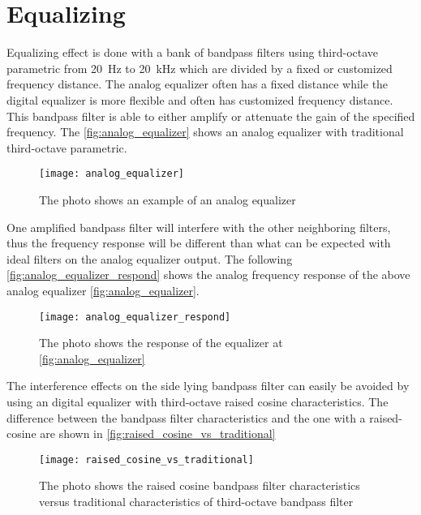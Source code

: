 \section{Equalizing}
Equalizing effect is done with a bank of bandpass filters using third-octave parametric from \SI{20}{\hertz} to \SI{20}{\kilo\hertz} which are divided by a fixed or customized frequency distance. The analog equalizer often has a fixed distance while the digital equalizer is more flexible and often has customized frequency distance. This bandpass filter is able to either amplify or attenuate the gain of the specified frequency. The \autoref{fig:analog_equalizer} shows an analog equalizer with traditional third-octave parametric. \cite{nordic}

\begin{figure} [htbp]
 \centering
  \texttt{[image: analog\_equalizer]}
  \caption{The photo shows an example of an analog equalizer}
  \label{fig:analog_equalizer}
\end{figure}

One amplified bandpass filter will interfere with the other neighboring filters, thus the frequency response will be different than what can be expected with ideal filters on the analog equalizer output. The following \autoref{fig:analog_equalizer_respond} shows the analog frequency response of the above analog equalizer \autoref{fig:analog_equalizer}.

\begin{figure} [htbp]
 \centering
  \texttt{[image: analog\_equalizer\_respond]}
  \caption{The photo shows the response of the equalizer at \autoref{fig:analog_equalizer} }
  \label{fig:analog_equalizer_respond}
\end{figure}

The interference effects on the side lying bandpass filter can easily be avoided by using an digital equalizer with third-octave raised cosine characteristics. The difference between the  bandpass filter characteristics and the one with a raised-cosine are shown in \autoref{fig:raised_cosine_vs_traditional}

\begin{figure} [htbp]
 \centering
  \texttt{[image: raised\_cosine\_vs\_traditional]}
  \caption{The photo shows the raised cosine bandpass filter characteristics versus traditional characteristics of third-octave bandpass filter %
  }
  \label{fig:raised_cosine_vs_traditional}
\end{figure}



